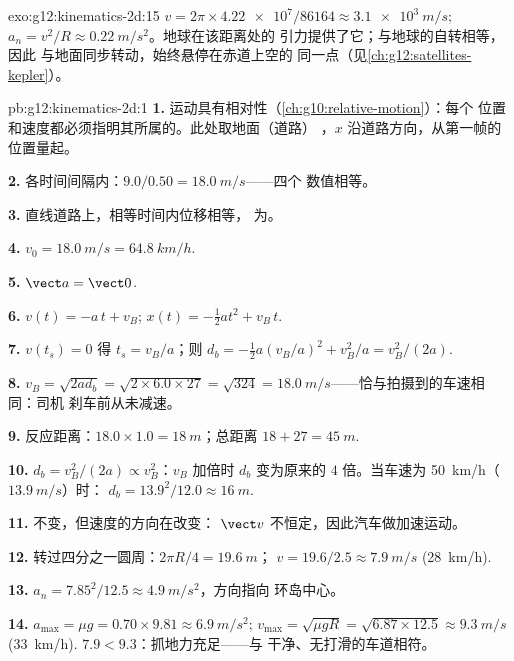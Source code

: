 \begin{solution}{exo:g12:kinematics-2d:15}
$v = 2\pi \times \num{4.22e7}/\num{86164} \approx \qty{3.1e3}{m/s}$;
$a_n = v^2/R \approx \qty{0.22}{m/s^2}$。地球在该距离处的
引力提供了它；与地球的自转相等，因此
与地面同步转动，始终悬停在赤道上空的
同一点（见\cref{ch:g12:satellites-kepler}）。
\end{solution}

\begin{solution}{pb:g12:kinematics-2d:1}
\textbf{1.} 运动具有相对性（\cref{ch:g10:relative-motion}）：每个
位置和速度都必须指明其所属的。此处取地面（道路）
，$x$ 沿道路方向，从第一帧的位置量起。

\textbf{2.} 各时间间隔内：$9.0/0.50 = \qty{18.0}{m/s}$——四个
数值相等。

\textbf{3.} 直线道路上，相等时间内位移相等，
为。

\textbf{4.} $v_0 = \qty{18.0}{m/s} = \qty{64.8}{km/h}$.

\textbf{5.} $\vect a = \vect 0$.

\textbf{6.} $v(t) = -a\,t + v_B$; $x(t) = -\tfrac12 a t^2 + v_B\,t$.

\textbf{7.} $v(t_s) = 0$ 得 $t_s = v_B/a$；则
$d_b = -\tfrac12 a (v_B/a)^2 + v_B^2/a = v_B^2/(2a)$.

\textbf{8.} $v_B = \sqrt{2 a d_b} = \sqrt{2 \times 6.0 \times 27} =
\sqrt{324} = \qty{18.0}{m/s}$——恰与拍摄到的车速相同：司机
刹车前从未减速。

\textbf{9.} 反应距离：$18.0 \times 1.0 = \qty{18}{m}$；总距离
$18 + 27 = \qty{45}{m}$.

\textbf{10.} $d_b = v_B^2/(2a) \propto v_B^2$：$v_B$ 加倍时
$d_b$ 变为原来的 $4$ 倍。当车速为 \qty{50}{km/h}（$\qty{13.9}{m/s}$）时：
$d_b = 13.9^2/12.0 \approx \qty{16}{m}$.

\textbf{11.} 不变，但速度的方向在改变：
$\vect v$ 不恒定，因此汽车做加速运动。

\textbf{12.} 转过四分之一圆周：$2\pi R/4 = \qty{19.6}{m}$；
$v = 19.6/2.5 \approx \qty{7.9}{m/s}$ (\qty{28}{km/h}).

\textbf{13.} $a_n = 7.85^2/12.5 \approx \qty{4.9}{m/s^2}$，方向指向
环岛中心。

\textbf{14.} $a_{\max} = \mu g = 0.70 \times 9.81 \approx
\qty{6.9}{m/s^2}$; $v_{\max} = \sqrt{\mu g R} =
\sqrt{6.87 \times 12.5} \approx \qty{9.3}{m/s}$ (\qty{33}{km/h}).
$7.9 < 9.3$：抓地力充足——与
干净、无打滑的车道相符。


\end{solution}
